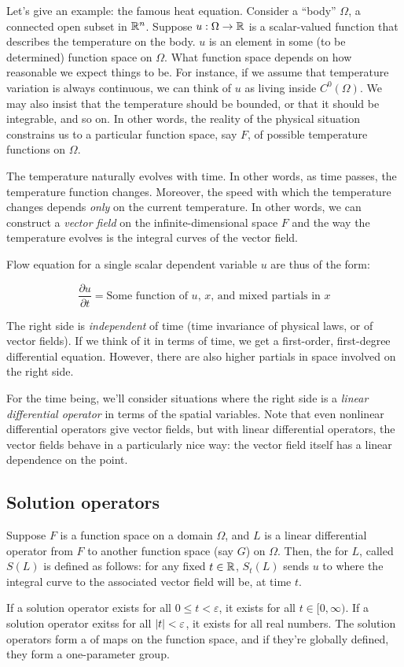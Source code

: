 \documentclass[a4paper]{amsart}
\begin{document}
Let's give an example: the famous heat equation. Consider a ``body''
$\Omega$, a connected open subset in $\mathbb{R}^n$. Suppose $u: \Omega \to
\mathbb{R}$ is a scalar-valued function that describes the temperature on the
body. $u$ is an element in some (to be determined) function space on
$\Omega$. What function space depends on how reasonable we expect
things to be. For instance, if we assume that temperature variation is
always continuous, we can think of $u$ as living inside
$C^0(\Omega)$. We may also insist that the temperature should be
bounded, or that it should be integrable, and so on. In other words,
the reality of the physical situation constrains us to a particular
function space, say $F$, of possible temperature functions on $\Omega$.

The temperature naturally evolves with time. In other words, as time
passes, the temperature function changes. Moreover, the speed with
which the temperature changes depends {\em only} on the current
temperature. In other words, we can construct a {\em vector field} on
the infinite-dimensional space $F$ and the way the temperature evolves
is the integral curves of the vector field.

Flow equation for a single scalar dependent variable $u$ are thus of the form:

$$\frac{\partial u}{\partial t} = \text{Some function of $u$, $x$, and mixed partials in $x$}$$

The right side is {\em independent} of time (time invariance of
physical laws, or of vector fields). If we think of it in terms of
time, we get a first-order, first-degree differential
equation. However, there are also higher partials in space involved on
the right side.

For the time being, we'll consider situations where the right side is
a {\em linear differential operator} in terms of the spatial
variables. Note that even nonlinear differential operators give vector
fields, but with linear differential operators, the vector fields
behave in a particularly nice way: the vector field itself has a
linear dependence on the point.

\subsection{Solution operators}

\begin{definer}
  Suppose $F$ is a function space on a domain $\Omega$, and $L$ is a
  linear differential operator from $F$ to another function space (say
  $G$) on $\Omega$. Then, the  for $L$,
  called $S(L)$ is defined as follows: for any fixed $t \in \mathbb{R}$,
  $S_t(L)$ sends $u$ to where the integral curve to the associated
  vector field will be, at time $t$.

  If a solution operator exists for all $0 \le t < \varepsilon$, it
  exists for all $t \in [0,\infty)$. If a solution operator exitss for
  all $\left|t\right| < \varepsilon$, it exists for all real numbers. The
  solution operators form a 
  of maps on the function space, and if they're globally defined, they
  form a one-parameter group.
\end{definer}
\end{document}
